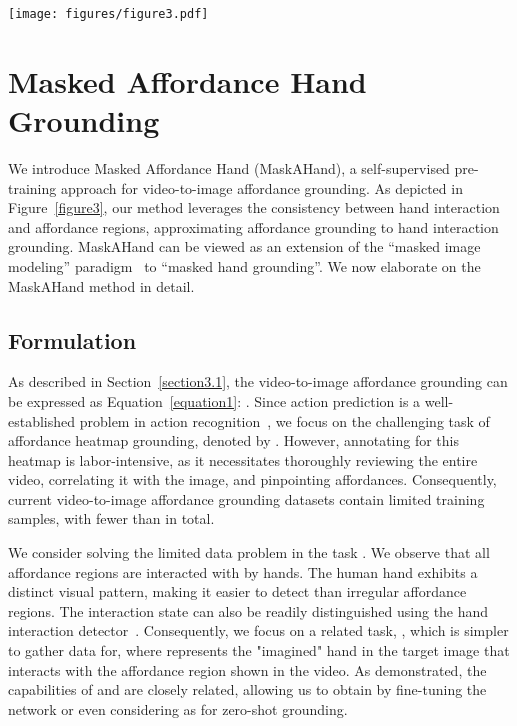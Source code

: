\documentclass[10pt,twocolumn,letterpaper]{article}
\begin{document}
{\begin{figure*}[t]
    \centering
    \texttt{[image: figures/figure3.pdf]}
    \caption{MaskAHand pre-training focuses on ``video-to-image masked interaction hand grounding'', acting as a proxy task for video-to-image affordance grounding. There are two steps: (1) video and target image synthesis including hand interaction, and (2) training Afformer with the generated data to learn ``video-to-image masked interaction hand grounding''. GT stands for ``ground-truth''.}
    \label{figure3}
\end{figure*}

\section{Masked Affordance Hand Grounding}

We introduce Masked Affordance Hand (MaskAHand), a self-supervised pre-training approach for video-to-image affordance grounding. As depicted in Figure~\ref{figure3}, our method leverages the consistency between hand interaction and affordance regions, approximating affordance grounding to hand interaction grounding. MaskAHand can be viewed as an extension of the ``masked image modeling'' paradigm~\cite{maskfeat,mae,oatrans} to ``masked hand grounding''. We now elaborate on the MaskAHand method in detail.

\subsection{Formulation} \label{section4.1}

As described in Section~\ref{section3.1}, the video-to-image affordance grounding can be expressed as Equation~\ref{equation1}: . 
Since action prediction is a well-established problem in action recognition~\cite{kinetics400,c3d,slowfast,stmae,morphmlp}, we focus on the challenging task of affordance heatmap grounding, denoted by . However, annotating for this heatmap is labor-intensive, as it necessitates thoroughly reviewing the entire video, correlating it with the image, and pinpointing affordances. Consequently, current video-to-image affordance grounding datasets contain limited training samples, with fewer than  in total.

We consider solving the limited data problem in the task . We observe that all affordance regions are interacted with by hands. The human hand exhibits a distinct visual pattern, making it easier to detect than irregular affordance regions. The interaction state can also be readily distinguished using the hand interaction detector~\cite{100doh}. Consequently, we focus on a related task, , which is simpler to gather data for, where  represents the "imagined" hand in the target image that interacts with the affordance region shown in the video. As demonstrated, the capabilities of  and  are closely related, allowing us to obtain  by fine-tuning the  network or even considering  as  for zero-shot grounding.

}
\end{document}
